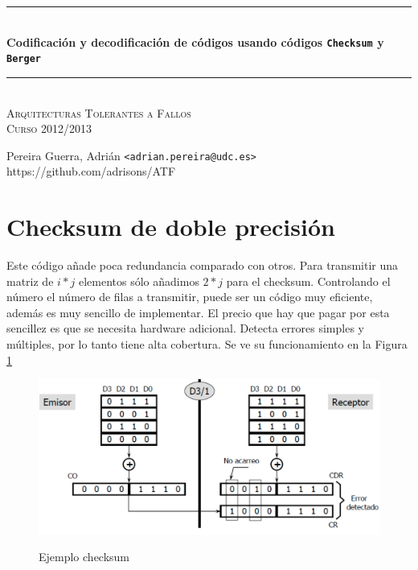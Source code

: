 \documentclass[a4paper]{article}
\newcommand{\HRule}{\rule{\linewidth}{0.5mm}}
\begin{document}
		\begin{center}

			\HRule \\[0.4cm]
			{ \huge \bfseries Codificación y decodificación de códigos usando códigos \texttt{Checksum} y \texttt{Berger}}\\[0.4cm]
			\HRule \\[0cm]

			\vspace{1cm}
			\textsc{\Large Arquitecturas Tolerantes a Fallos}\\[0.5cm]
			\textsc{\Large Curso 2012/2013}\\[0.5cm]

		\end{center}

		\begin{center}
		Pereira Guerra, Adrián \texttt{<adrian.pereira@udc.es>}\\
		https://github.com/adrisons/ATF
		\end{center}
		\vspace{1cm}


\tableofcontents
\vspace{3cm}


%	
\section{Checksum de doble precisión}
	Este código añade poca redundancia comparado con otros. Para transmitir una matriz de $i * j$ elementos sólo añadimos $2 * j$ para el checksum. Controlando el número el número de filas a transmitir, puede ser un código muy eficiente, además es muy sencillo de implementar. El precio que hay que pagar por esta sencillez es que se necesita hardware adicional.
	Detecta errores simples y múltiples, por lo tanto tiene alta cobertura. Se ve su funcionamiento en la Figura \ref{ej_cs}
	\begin{figure}[h!]
	\centering
	\includegraphics[width=\textwidth]{res/ejemplo_cs}
	\label{ej_cs}
	\caption{Ejemplo checksum}
	\end{figure}
\end{document}
